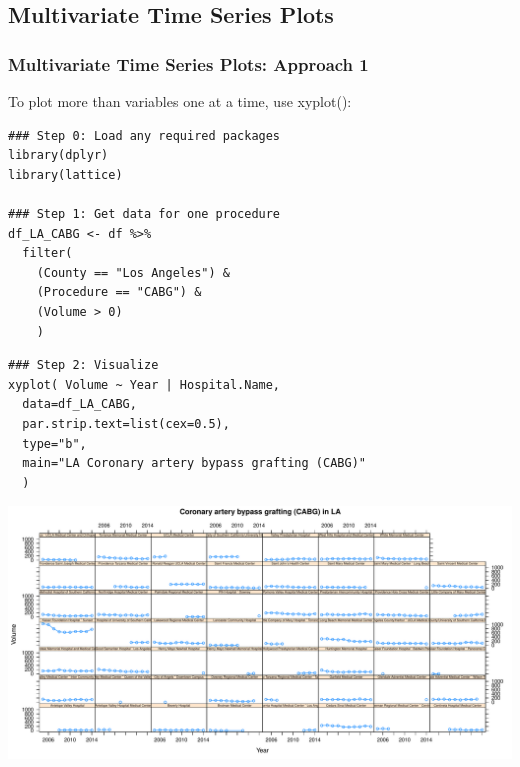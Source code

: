 

\subsection{Multivariate Time Series Plots}


\begin{frame}
 \frametitle{Multivariate Time Series Plots: Approach 1}

To plot more than variables one at a time, use \ttfamily xyplot()\normalfont [5]:
		\begin{lstlisting}
### Step 0: Load any required packages
library(dplyr)
library(lattice)

### Step 1: Get data for one procedure
df_LA_CABG <- df %>%
  filter( 
    (County == "Los Angeles") & 
    (Procedure == "CABG") & 
    (Volume > 0) 
    )
    \end{lstlisting}

\newpage    
    \begin{lstlisting}
### Step 2: Visualize    
xyplot( Volume ~ Year | Hospital.Name, 
  data=df_LA_CABG,
  par.strip.text=list(cex=0.5),
  type="b",
  main="LA Coronary artery bypass grafting (CABG)"
  )
		\end{lstlisting}

\newpage
      \begin{center}
         \includegraphics[width=1.05\textwidth]{images/timeseries_LA_CABG}
      \end{center}
\end{frame}

